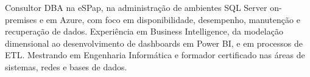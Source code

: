 {\color{cinza}\raggedright
Consultor DBA na eSPap, na administração de ambientes SQL Server on-premises e em Azure, com foco em disponibilidade, desempenho, manutenção e recuperação de dados. Experiência em Business Intelligence, da modelação dimensional ao desenvolvimento de dashboards em Power BI, e em processos de ETL. Mestrando em Engenharia Informática e formador certificado nas áreas de sistemas, redes e bases de dados.\par}
